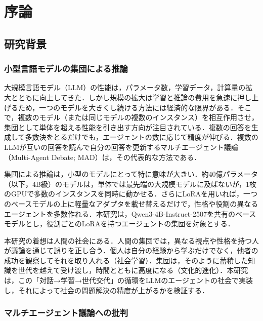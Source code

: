 

\chapter{序論}
\label{cha:1}

\section{研究背景}
\label{sec:1.1}

\subsection{小型言語モデルの集団による推論}
\label{sec:1.1.1}

大規模言語モデル（LLM）の性能は，パラメータ数，学習データ，計算量の拡大とともに向上してきた．しかし規模の拡大は学習と推論の費用を急速に押し上げるため，一つのモデルを大きくし続ける方法には経済的な限界がある．そこで，複数のモデル（または同じモデルの複数のインスタンス）を相互作用させ，集団として単体を超える性能を引き出す方向が注目されている．複数の回答を生成して多数決をとるだけでも，エージェントの数に応じて精度が伸びる\cite{li2024more}．複数のLLMが互いの回答を読んで自分の回答を更新するマルチエージェント議論（Multi-Agent Debate; MAD）\cite{du2023improving,liang2023encouraging}は，その代表的な方法である．

集団による推論は，小型のモデルにとって特に意味が大きい．約40億パラメータ（以下，4B級）のモデルは，単体では最先端の大規模モデルに及ばないが，1枚のGPUで多数のインスタンスを同時に動かせる．さらにLoRA\cite{hu2021lora}を用いれば，一つのベースモデルの上に軽量なアダプタを載せ替えるだけで，性格や役割の異なるエージェントを多数作れる．本研究は，Qwen3-4B-Instruct-2507\cite{qwen2025qwen3}を共有のベースモデルとし，役割ごとのLoRAを持つエージェントの集団を対象とする．

本研究の着想は人間の社会にある．人間の集団では，異なる視点や性格を持つ人が議論を通じて誤りを正し合う．個人は自分の経験から学ぶだけでなく，他者の成功を観察してそれを取り入れる（社会学習）．集団は，そのように蓄積した知識を世代を越えて受け渡し，時間とともに高度になる（文化的進化\cite{boyd1985culture}）．本研究は，この「対話→学習→世代交代」の循環をLLMのエージェントの社会で実装し，それによって社会の問題解決の精度が上がるかを検証する．

\subsection{マルチエージェント議論への批判}
\label{sec:1.1.2}


